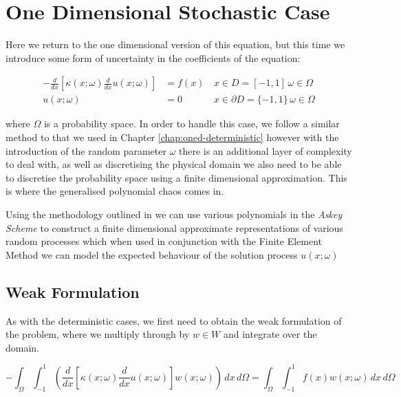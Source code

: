\chapter{One Dimensional Stochastic Case}\label{chap:oned-stochastic}

Here we return to the one dimensional version of this equation, but this time
we introduce some form of uncertainty in the coefficients of the equation:

\begin{equation}\label{eq:oned-stochastic}
  \begin{aligned}
      -\frac{d}{dx}\left[\kappa(x;\omega)\frac{d}{dx}u(x;\omega)\right] &= f(x)\,
                              &x \in  D = [-1,1]\, \omega \in \Omega \\
    u(x;\omega) &= 0 &x \in \partial D = \{-1,1\}\, \omega \in \Omega
  \end{aligned}
\end{equation}

where $\Omega$ is a probability space. In order to handle this case, we follow
a similar method to that we used in Chapter \ref{chap:oned-deterministic}
however with the introduction of the random parameter $\omega$ there is an
additional layer of complexity to deal with, as well as discretising the
physical domain we also need to be able to discretise the probability space
using a finite dimensional approximation.  This is where the generalised
polynomial chaos comes in.

Using the methodology outlined in \cite{general-poly-chaos} we can use various
polynomials in the \textit{Askey Scheme} to construct a finite dimensional
approximate representations of various random processes which when used in
conjunction with the Finite Element Method we can model the expected behaviour
of the solution process $u(x;\omega)$

\section{Weak Formulation}


As with the deterministic cases, we first need to obtain the weak formulation
of the problem, where we multiply through by $w \in W$ and integrate over the
domain.

\begin{equation}
    -\int_{\Omega}\int_{-1}^1\left(\frac{d}{dx}\left[\kappa(x;\omega)\frac{d}{dx}u(x;\omega)\right]
    w(x;\omega)\right)\, dx\, d\Omega = \int_{\Omega}\int_{-1}^1 f(x)w(x;\omega)\, dx\, d\Omega
\end{equation}

